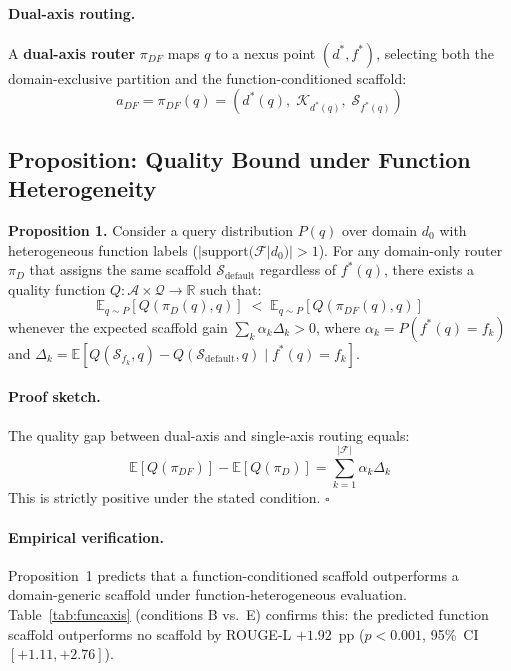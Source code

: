 \documentclass[a4paper,fleql,doubleblind]{cas-sc}
\begin{document}
\paragraph{Dual-axis routing.}
A \textbf{dual-axis router} $\pi_{DF}$ maps $q$ to a nexus point $(d^*, f^*)$,
selecting both the domain-exclusive partition and the function-conditioned scaffold:
\begin{equation}
    a_{DF} = \pi_{DF}(q) = (d^*(q),\; \mathcal{K}_{d^*(q)},\; \mathcal{S}_{f^*(q)})
    \label{eq:dual_axis_theory}
\end{equation}

\subsection{Proposition: Quality Bound under Function Heterogeneity}
\label{ssec:proposition}

\begin{tcolorbox}[colback=gray!5, colframe=gray!30, arc=2pt, boxrule=0.6pt,
  left=8pt, right=8pt, top=6pt, bottom=6pt]
\textbf{Proposition 1.}
Consider a query distribution $P(q)$ over domain $d_0$ with heterogeneous function
labels ($|\text{support}(\mathcal{F}|d_0)| > 1$). For any domain-only router $\pi_D$
that assigns the same scaffold $\mathcal{S}_{\text{default}}$ regardless of $f^*(q)$,
there exists a quality function $Q: \mathcal{A} \times \mathcal{Q} \to \mathbb{R}$
such that:
\begin{equation}
    \mathbb{E}_{q \sim P}[Q(\pi_D(q), q)] \;<\; \mathbb{E}_{q \sim P}[Q(\pi_{DF}(q), q)]
    \label{eq:prop1}
\end{equation}
whenever the expected scaffold gain $\sum_{k} \alpha_k \Delta_k > 0$,
where $\alpha_k = P(f^*(q) = f_k)$ and $\Delta_k = \mathbb{E}[Q(\mathcal{S}_{f_k}, q) - Q(\mathcal{S}_{\text{default}}, q) \mid f^*(q) = f_k]$.
\end{tcolorbox}

\paragraph{Proof sketch.}
The quality gap between dual-axis and single-axis routing equals:
\begin{equation}
    \mathbb{E}[Q(\pi_{DF})] - \mathbb{E}[Q(\pi_D)] = \sum_{k=1}^{|\mathcal{F}|} \alpha_k \Delta_k
    \label{eq:prop1_gap}
\end{equation}
This is strictly positive under the stated condition. $\square$

\paragraph{Empirical verification.}
Proposition~1 predicts that a function-conditioned scaffold outperforms a
domain-generic scaffold under function-heterogeneous evaluation.
Table~\ref{tab:funcaxis} (conditions B vs.\ E) confirms this: the predicted
function scaffold outperforms no scaffold by ROUGE-L $+1.92$~pp
($p{<}0.001$, 95\%~CI $[{+}1.11,{+}2.76]$).
\end{document}
